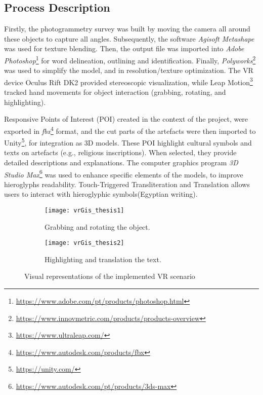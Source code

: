 \subsection*{Process Description}

Firstly, the photogrammetry survey was built by moving the camera all around these objects to capture all angles. Subsequently, the software \textit{Agisoft Metashape} was used for texture blending. Then, the output file was imported into \textit{Adobe Photoshop}\footnote{\url{https://www.adobe.com/pt/products/photoshop.html}} for word delineation, outlining and identification. 
Finally, \textit{Polyworks}\footnote{\url{https://www.innovmetric.com/products/products-overview}} was used to simplify the model, and in resolution/texture optimization.
The \gls{VR} device Oculus Rift DK2 provided stereoscopic visualization, while Leap Motion\footnote{\url{https://www.ultraleap.com/}} tracked hand movements for object interaction (grabbing, rotating, and highlighting).

Responsive Points of Interest (\gls{POI}) created in the context of the project, were exported in \textit{fbx}\footnote{\url{https://www.autodesk.com/products/fbx}} format, and the cut parts of the artefacts were then imported to Unity\footnote{\url{https://unity.com/}}, for integration as \gls{3D} models.
These \gls{POI} highlight cultural symbols and texts on artefacts (e.g., religious inscriptions). When selected, they provide detailed descriptions and explanations.
The computer graphics program \textit{\gls{3D} Studio Max}\footnote{\url{https://www.autodesk.com/pt/products/3ds-max}} was used to enhance specific elements of the models, to improve hieroglyphs readability.
Touch-Triggered Transliteration and Translation allows users to interact with hieroglyphic symbols(Egyptian writing). 


\begin{figure}[h!]
  \centering
  \begin{subfigure}[b]{0.45\textwidth}
      \centering
      \texttt{[image: vrGis\_thesis1]}
      \caption{Grabbing and rotating the object.}
      \label{fig:vrGis_thesis1}
  \end{subfigure}
  \hfill
  \begin{subfigure}[b]{0.45\textwidth}
      \centering
      \texttt{[image: vrGis\_thesis2]}
      \caption{Highlighting and translation the text.}
      \label{fig:vrGis_thesis2}
  \end{subfigure}
     \caption{Visual representations of the implemented \gls{VR} scenario}
     \label{fig:vrGis_thesis}
\end{figure}

